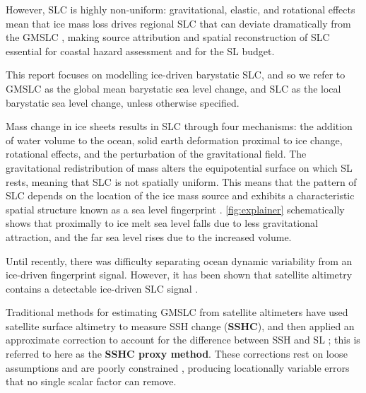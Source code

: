 However, SLC is highly non-uniform: gravitational, elastic, and rotational effects mean that ice mass loss drives regional SLC that can deviate dramatically from the GMSLC \autocite{mitrovicaRobustnessPredictionsSea2011}, making source attribution and spatial reconstruction of SLC essential for coastal hazard assessment and for the SL budget.

This report focuses on modelling ice-driven barystatic SLC, and so we refer to GMSLC as the global mean barystatic sea level change, and SLC as the local barystatic sea level change, unless otherwise specified.

Mass change in ice sheets results in SLC through four mechanisms: the addition of water volume to the ocean, solid earth deformation proximal to ice change, rotational effects, and the perturbation of the gravitational field. The gravitational redistribution of mass alters the equipotential surface on which SL rests, meaning that SLC is not spatially uniform. This means that the pattern of SLC depends on the location of the ice mass source and exhibits a characteristic spatial structure known as a sea level fingerprint \autocite{farrellPostglacialSeaLevel1976, mitrovicaRobustnessPredictionsSea2011}. \autoref{fig:explainer} schematically shows that proximally to ice melt sea level falls due to less gravitational attraction, and the far sea level rises due to the increased volume.


Until recently, there was difficulty separating ocean dynamic variability from an ice-driven fingerprint signal. However, it has been shown that satellite altimetry contains a detectable ice-driven SLC signal \autocite{coulsonDetectionSeaLevel2022}.

Traditional methods for estimating GMSLC from satellite altimeters have used satellite surface altimetry to measure SSH change (\textbf{SSHC}), and then applied an approximate correction to account for the difference between SSH and SL \autocites[e.g.][]{neremEstimatingMeanSea2010, peltierClosureBudgetGlobal2009}; this is referred to here as the \textbf{SSHC proxy method}. These corrections rest on loose assumptions and are poorly constrained \autocite{lickleyBiasEstimatesGlobal2018, tamisieaOngoingGlacialIsostatic2011}, producing locationally variable errors that no single scalar factor can remove.


